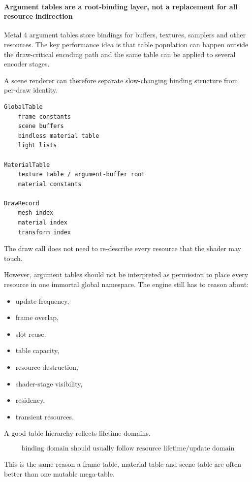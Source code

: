\paragraph{Argument tables are a root-binding layer, not a replacement for all resource indirection}\label{argument-tables-are-a-root-binding-layer-not-a-replacement-for-all-resource-indirection}

Metal 4 argument tables store bindings for buffers, textures, samplers and other resources. The key performance idea is that table population can happen outside the draw-critical encoding path and the same table can be applied to several encoder stages.

A scene renderer can therefore separate slow-changing binding structure from per-draw identity.

\begin{verbatim}
GlobalTable
    frame constants
    scene buffers
    bindless material table
    light lists

MaterialTable
    texture table / argument-buffer root
    material constants

DrawRecord
    mesh index
    material index
    transform index
\end{verbatim}

The draw call does not need to re-describe every resource that the shader may touch.

However, argument tables should not be interpreted as permission to place every resource in one immortal global namespace. The engine still has to reason about:

\begin{itemize}
\tightlist
\item
  update frequency,
\item
  frame overlap,
\item
  slot reuse,
\item
  table capacity,
\item
  resource destruction,
\item
  shader-stage visibility,
\item
  residency,
\item
  transient resources.
\end{itemize}

A good table hierarchy reflects lifetime domains.

\[
\boxed{
\text{binding domain should usually follow resource lifetime/update domain}
}
\]

This is the same reason a frame table, material table and scene table are often better than one mutable mega-table.

